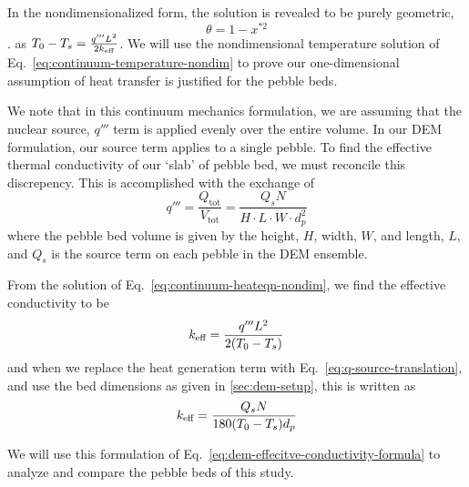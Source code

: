 In the nondimensionalized form, the solution is revealed to be purely geometric,
\begin{equation}\label{eq:continuum-temperature-nondim}
	\theta = 1-x^{*2}
\end{equation}. 
as $T_0  - T_s = \frac{q'''L^2}{2k_\text{eff}}$. We will use the nondimensional temperature solution of Eq.~\ref{eq:continuum-temperature-nondim} to prove our one-dimensional assumption of heat transfer is justified for the pebble beds.

We note that in this continuum mechanics formulation, we are assuming that the nuclear source, $q'''$ term is applied evenly over the entire volume. In our DEM formulation, our source term applies to a single pebble. To find the effective thermal conductivity of our `slab' of pebble bed, we must reconcile this discrepency. This is accomplished with the exchange of
\begin{equation}\label{eq:q-source-translation}
	q''' = \frac{Q_\text{tot}}{V_\text{tot}} = \frac{Q_sN}{H\cdot L\cdot W\cdot d_p^2}
\end{equation}
where the pebble bed volume is given by the height, $H$, width, $W$, and length, $L$, and $Q_s$ is the source term on each pebble in the DEM ensemble. 

From the solution of Eq.~\ref{eq:continuum-heateqn-nondim}, we find the effective conductivity to be
\begin{equation}
	k_\text{eff} = \frac{q''' L^2}{2(T_0-T_s)}
\end{equation}
and when we replace the heat generation term with Eq.~\ref{eq:q-source-translation}, and use the bed dimensions as given in \cref{sec:dem-setup}, this is written as
\begin{equation}\label{eq:dem-effecitve-conductivity-formula}
	k_\text{eff} = \frac{Q_sN}{180(T_0-T_s)d_p}
\end{equation}

We will use this formulation of Eq.~\ref{eq:dem-effecitve-conductivity-formula} to analyze and compare the pebble beds of this study.



